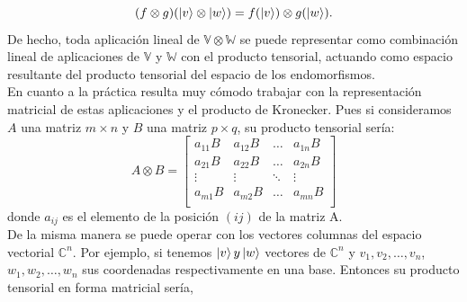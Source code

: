 \documentclass[a4paper]{article}
\numberwithin{equation}{section}
\begin{document}
\begin{equation} \label{prtensorial_aplineal}
(f\otimes g) (\ket{v}\otimes\ket{w}) = f(\ket{v}) \otimes g(\ket{w}).
\end{equation}
De hecho, toda aplicación lineal de $\mathbb{V}\otimes\mathbb{W}$ se puede representar como combinación lineal de aplicaciones de $\mathbb{V}$ y $\mathbb{W}$ con el producto tensorial, actuando como espacio resultante del producto tensorial del espacio de los endomorfismos.
\\
En cuanto a la práctica resulta muy cómodo trabajar con la representación matricial de estas aplicaciones y el producto de Kronecker. Pues si consideramos $A$ una matriz $m\times n$ y $B$ una matriz $p\times q$, su producto tensorial sería:
\begin{equation}
A\otimes B =
\begin{bmatrix}
a_{11}B & a_{12}B & \ldots & a_{1n}B \\
a_{21}B & a_{22}B & \ldots & a_{2n}B \\
\vdots & \vdots & \ddots & \vdots \\
a_{m1}B & a_{m2}B & \ldots & a_{mn}B \\
\end{bmatrix}
\end{equation}
donde $a_{ij}$ es el elemento de la posición $(ij)$ de la matriz A.
\\
De la misma manera se puede operar con los vectores columnas del espacio vectorial $\mathbb{C}^n$. Por ejemplo, si tenemos $\ket{v} y \ket{w}$ vectores de $\mathbb{C}^n$ y $v_1, v_2, \ldots, v_n$, $w_1, w_2, \ldots, w_n$ sus coordenadas respectivamente en una base. Entonces su producto tensorial en forma matricial sería,
\end{document}
